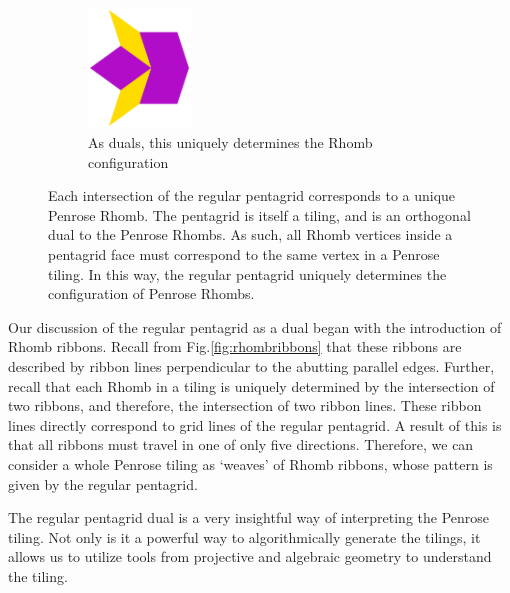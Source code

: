 \documentclass[
  oneside,
  11pt, a4paper,
  footinclude=true,
  headinclude=true,
  cleardoublepage=empty
]{scrbook}
\begin{document}
\begin{figure}[H]
\begin{subfigure}[b]{\textwidth}
\centering
\includegraphics[width=0.3\textwidth]{RhombConstructed}
\caption{As duals, this uniquely determines the Rhomb configuration}
\end{subfigure}
\caption[Construction of Penrose Tiling from Pentagrids]{Each intersection of the regular pentagrid corresponds to a unique Penrose Rhomb. The pentagrid is itself a tiling, and is an orthogonal dual to the Penrose Rhombs. As such, all Rhomb vertices inside a pentagrid face must correspond to the same vertex in a Penrose tiling. In this way, the regular pentagrid uniquely determines the configuration of Penrose Rhombs.}
\label{fig:pentagridconstruction}
\end{figure}

Our discussion of the regular pentagrid as a dual began with the introduction of Rhomb ribbons. Recall from Fig.\ref{fig:rhombribbons} that these ribbons are described by ribbon lines perpendicular to the abutting parallel edges. Further, recall that each Rhomb in a tiling is uniquely determined by the intersection of two ribbons, and therefore, the intersection of two ribbon lines. These ribbon lines directly correspond to grid lines of the regular pentagrid. A result of this is that all ribbons must travel in one of only five directions. Therefore, we can consider a whole Penrose tiling as `weaves' of Rhomb ribbons, whose pattern is given by the regular pentagrid. 

The regular pentagrid dual is a very insightful way of interpreting the Penrose tiling. Not only is it a powerful way to algorithmically generate the tilings, it allows us to utilize tools from projective and algebraic geometry to understand the tiling.
\end{document}
